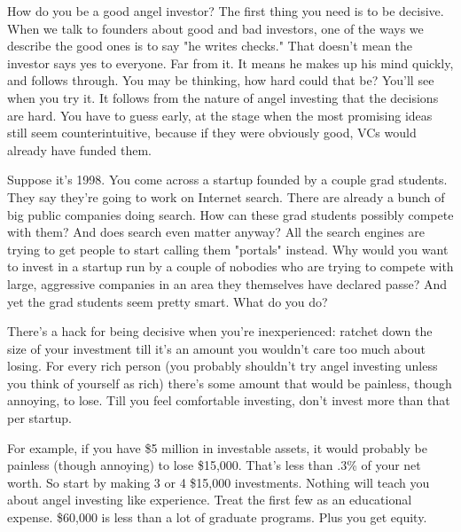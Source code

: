 How do
                  you be a good angel investor? The first thing you need is to
                  be decisive. When we talk to founders about good and bad
                  investors, one of the ways we describe the good ones is to say
                  "he writes checks." That doesn't mean the investor says yes to
                  everyone. Far from it. It means he makes up his mind quickly,
                  and follows through. You may be thinking, how hard could that
                  be? You'll see when you try it. It follows from the nature of
                  angel investing that the decisions are hard. You have to guess
                  early, at the stage when the most promising ideas still seem
                  counterintuitive, because if they were obviously good, VCs
                  would already have funded them.

Suppose it's 1998.
                  You come across a startup founded by a couple grad students.
                  They say they're going to work on Internet search. There are
                  already a bunch of big public companies doing search. How can
                  these grad students possibly compete with them? And does
                  search even matter anyway? All the search engines are trying
                  to get people to start calling them "portals" instead. Why
                  would you want to invest in a startup run by a couple of
                  nobodies who are trying to compete with large, aggressive
                  companies in an area they themselves have declared passe? And
                  yet the grad students seem pretty smart. What do you do?

There's
                  a hack for being decisive when you're inexperienced: ratchet
                  down the size of your investment till it's an amount you
                  wouldn't care too much about losing. For every rich person
                  (you probably shouldn't try angel investing unless you think
                  of yourself as rich) there's some amount that would be
                  painless, though annoying, to lose. Till you feel comfortable
                  investing, don't invest more than that per startup.

For
                  example, if you have \$5 million in investable assets, it would
                  probably be painless (though annoying) to lose \$15,000. That's
                  less than .3\% of your net worth. So start by making 3 or 4
                  \$15,000 investments. Nothing will teach you about angel
                  investing like experience. Treat the first few as an
                  educational expense. \$60,000 is less than a lot of graduate
                  programs. Plus you get equity.

